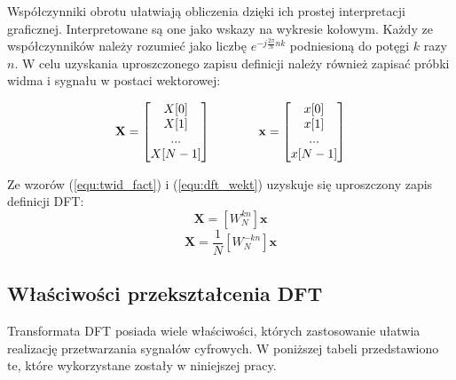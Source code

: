 Współczynniki obrotu ułatwiają obliczenia dzięki ich prostej interpretacji graficznej. Interpretowane są one jako wskazy na wykresie kołowym. Każdy ze współczynników należy rozumieć jako liczbę $e^{-j\frac{2\pi}{N}nk}$ podniesioną do potęgi $k$ razy $n$. W celu uzyskania uproszczonego zapisu definicji należy również zapisać próbki widma i sygnału w postaci wektorowej:

\begin{equation} \label{equ:dft_wekt}
\openup\jot
\begin{aligned}[t]
\mathbf{X} = 
\begin{bmatrix} 
X[0] \\ X[1] \\ ... \\ X[N-1]
\end{bmatrix}
\end{aligned}
\qquad\qquad %
\begin{aligned}[t]
\mathbf{x} =  
\begin{bmatrix} 
x[0] \\ x[1] \\ ... \\ x[N-1]
\end{bmatrix}
\end{aligned}
\end{equation}

Ze wzorów (\ref{equ:twid_fact}) i (\ref{equ:dft_wekt}) uzyskuje się uproszczony zapis definicji DFT:
\begin{equation} \label{equ:dft_upr}
	\mathbf{X} = [W_{N}^{kn}]\mathbf{x}
\end{equation}
\begin{equation} \label{equ:idft_upr}
\mathbf{X} = \frac{1}{N}[W_{N}^{-kn}]\mathbf{x}
\end{equation}

\subsection{Właściwości przekształcenia DFT}
Transformata DFT posiada wiele właściwości, których zastosowanie ułatwia realizację przetwarzania sygnałów cyfrowych. W poniższej tabeli przedstawiono te, które wykorzystane zostały w niniejszej pracy.

